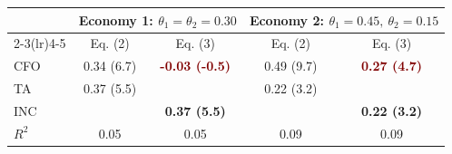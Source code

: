 \begin{tabular}{@{}lcccc@{}}
\toprule
 & \multicolumn{2}{c}{Economy 1: $\theta_1 = \theta_2 = 0.30$} & \multicolumn{2}{c}{Economy 2: $\theta_1 = 0.45,\ \theta_2 = 0.15$} \\
\cmidrule(lr){2-3}\cmidrule(lr){4-5}
 & Eq. (2) & Eq. (3) & Eq. (2) & Eq. (3) \\
\midrule
CFO & 0.34 (6.7) & \textcolor{Maroon}{\bfseries -0.03 (-0.5)} & 0.49 (9.7) & \textcolor{Maroon}{\bfseries 0.27 (4.7)} \\
TA  & 0.37 (5.5) & & 0.22 (3.2) & \\
INC & & \textcolor{DeepNavy}{\bfseries 0.37 (5.5)} & & \textcolor{DeepNavy}{\bfseries 0.22 (3.2)} \\
\midrule
$R^2$ & 0.05 & 0.05 & 0.09 & 0.09 \\
\bottomrule
\end{tabular}
